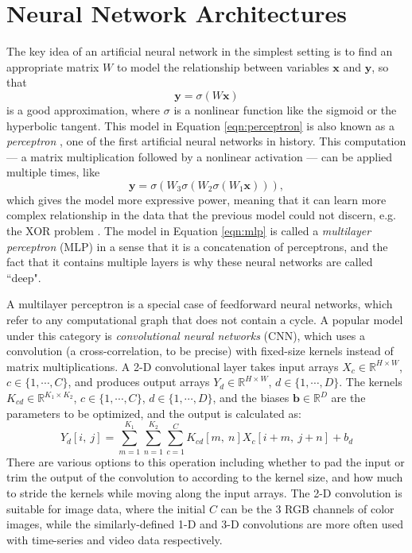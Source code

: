 \section{Neural Network Architectures}

The key idea of an artificial neural network in the simplest setting is to find an appropriate matrix $W$ to model the relationship between variables $\bm{x}$ and $\bm{y}$, so that
\begin{equation}\label{eqn:perceptron}
	\bm{y} = \sigma(W \bm{x})
\end{equation}
is a good approximation, where $\sigma$ is a nonlinear function like the sigmoid or the hyperbolic tangent.
This model in Equation \ref{eqn:perceptron} is also known as a \emph{perceptron} \cite{rosenblatt1957perceptron}, one of the first artificial neural networks in history.
This computation --- a matrix multiplication followed by a nonlinear activation --- can be applied multiple times, like
\begin{equation}\label{eqn:mlp}
	\bm{y} = \sigma(W_3\sigma(W_2 \sigma(W_1 \bm{x}))),
\end{equation}
which gives the model more expressive power, meaning that it can learn more complex relationship in the data that the previous model could not discern, e.g. the XOR problem \cite{riedmiller1994mlp}.
The model in Equation \ref{eqn:mlp} is called a \emph{multilayer perceptron} (MLP) in a sense that it is a concatenation of perceptrons, and the fact that it contains multiple layers is why these neural networks are called ``deep".


A multilayer perceptron is a special case of feedforward neural networks, which refer to any computational graph that does not contain a cycle.
A popular model under this category is \emph{convolutional neural networks} (CNN), which uses a convolution (a cross-correlation, to be precise) with fixed-size kernels instead of matrix multiplications.
A 2-D convolutional layer takes input arrays $X_c \in \mathbb{R}^{H \times W}$, $c \in \{ 1, \cdots, C \}$, and produces output arrays $Y_d \in \mathbb{R}^{H \times W}$, $d \in \{ 1, \cdots, D \}$.
The kernels $K_{cd} \in \mathbb{R}^{K_1 \times K_2}$, $c \in \{ 1, \cdots, C \}$, $d \in \{ 1, \cdots, D \}$, and the biases $\bm{b} \in \mathbb{R}^D$ are the parameters to be optimized, and the output is calculated as:
\begin{equation}\label{eqn:convnet}
Y_{d}[i,~j] = \sum_{m=1}^{K_1} \sum_{n=1}^{K_2} \sum_{c=1}^C K_{cd}[m,~n] X_c[i+m,~j+n] + b_d
\end{equation}
There are various options to this operation including whether to pad the input or trim the output of the convolution to according to the kernel size, and how much to stride the kernels while moving along the input arrays.
The 2-D convolution is suitable for image data, where the initial $C$ can be the 3 RGB channels of color images, while the similarly-defined 1-D and 3-D convolutions are more often used with time-series and video data respectively.

